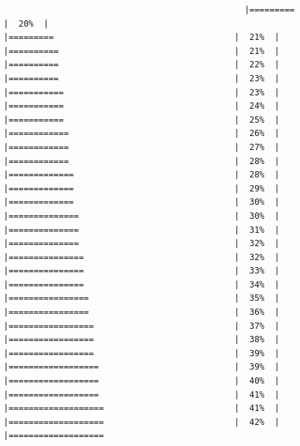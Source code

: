 \documentclass[
  krantz2]{krantz}
\begin{document}
\begin{verbatim}
                                                |=========                                    |  20%  |                                                     |=========                                    |  21%  |                                                     |==========                                   |  21%  |                                                     |==========                                   |  22%  |                                                     |==========                                   |  23%  |                                                     |===========                                  |  23%  |                                                     |===========                                  |  24%  |                                                     |===========                                  |  25%  |                                                     |============                                 |  26%  |                                                     |============                                 |  27%  |                                                     |============                                 |  28%  |                                                     |=============                                |  28%  |                                                     |=============                                |  29%  |                                                     |=============                                |  30%  |                                                     |==============                               |  30%  |                                                     |==============                               |  31%  |                                                     |==============                               |  32%  |                                                     |===============                              |  32%  |                                                     |===============                              |  33%  |                                                     |===============                              |  34%  |                                                     |================                             |  35%  |                                                     |================                             |  36%  |                                                     |=================                            |  37%  |                                                     |=================                            |  38%  |                                                     |=================                            |  39%  |                                                     |==================                           |  39%  |                                                     |==================                           |  40%  |                                                     |==================                           |  41%  |                                                     |===================                          |  41%  |                                                     |===================                          |  42%  |                                                     |===================           
\end{verbatim}
\end{document}
